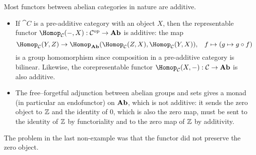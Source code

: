 Most functors between abelian categories in nature are additive.

\begin{exmp}
\begin{itemize}
\item
  If \(\cat C\) is a pre-additive category with an object \(X\), then the representable functor \(\Hom[\cat C](-,X)\colon\cat C\opp\to\catAbelianGroup\) is additive: the map
  \[ \Hom[\cat C](Y,Z) \to \Hom[\catAbelianGroup](\Hom[\cat C](Z,X),\Hom[\cat C](Y,X))\text{,} \quad f \mapsto (g\mapsto g\circ f) \]
  is a group homomorphism since composition in a pre-additive category is bilinear.
  Likewise, the corepresentable functor \(\Hom[\cat C](X,-)\colon\cat C\to\catAbelianGroup\) is also additive.
\item
  The free--forgetful adjunction between abelian groups and sets gives a monad (in particular an endofunctor) on \(\mathbf{Ab}\), which is not additive: it sends the zero object to \(\mathbb{Z}\) and the identity of \(0\), which is also the zero map, must be sent to the identity of \(\mathbb{Z}\) by functoriality and to the zero map of \(\mathbb{Z}\) by additivity.
\end{itemize}
\end{exmp}

The problem in the last non-example was that the functor did not preserve the zero object.

